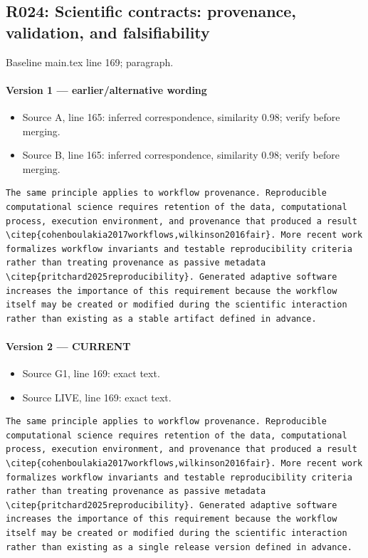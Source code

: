 \documentclass[11pt]{article}
\begin{document}
\subsection{R024: Scientific contracts: provenance, validation, and falsifiability}

Baseline main.tex line 169; paragraph.

\paragraph{Version 1 --- earlier/alternative wording}

\begin{itemize}[leftmargin=*]
\item Source A, line 165: inferred correspondence, similarity 0.98; verify before merging.
\item Source B, line 165: inferred correspondence, similarity 0.98; verify before merging.
\end{itemize}

\begin{lstlisting}
The same principle applies to workflow provenance. Reproducible computational science requires retention of the data, computational process, execution environment, and provenance that produced a result \citep{cohenboulakia2017workflows,wilkinson2016fair}. More recent work formalizes workflow invariants and testable reproducibility criteria rather than treating provenance as passive metadata \citep{pritchard2025reproducibility}. Generated adaptive software increases the importance of this requirement because the workflow itself may be created or modified during the scientific interaction rather than existing as a stable artifact defined in advance.
\end{lstlisting}

\paragraph{Version 2 --- CURRENT}

\begin{itemize}[leftmargin=*]
\item Source G1, line 169: exact text.
\item Source LIVE, line 169: exact text.
\end{itemize}

\begin{lstlisting}
The same principle applies to workflow provenance. Reproducible computational science requires retention of the data, computational process, execution environment, and provenance that produced a result \citep{cohenboulakia2017workflows,wilkinson2016fair}. More recent work formalizes workflow invariants and testable reproducibility criteria rather than treating provenance as passive metadata \citep{pritchard2025reproducibility}. Generated adaptive software increases the importance of this requirement because the workflow itself may be created or modified during the scientific interaction rather than existing as a single release version defined in advance.
\end{lstlisting}
\end{document}
